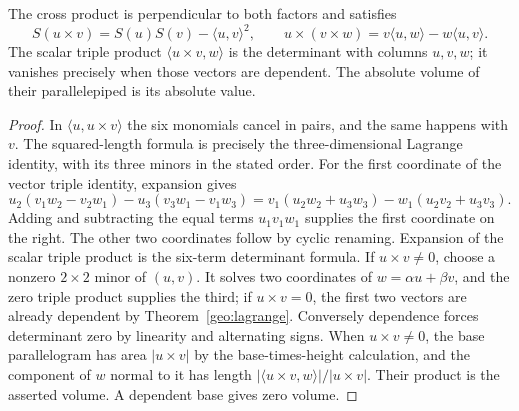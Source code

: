 \begin{theorem}
\label{geo:cross}
The cross product is perpendicular to both factors and satisfies
\[
 S(u\times v)=S(u)S(v)-\langle u,v\rangle^2,\qquad
 u\times(v\times w)=v\langle u,w\rangle-w\langle u,v\rangle.
\]
The scalar triple product $\langle u\times v,w\rangle$ is the determinant
with columns $u,v,w$; it vanishes precisely when those vectors are dependent.
The absolute volume of their parallelepiped is its absolute value.
\end{theorem}
\begin{proof}
In $\langle u,u\times v\rangle$ the six monomials cancel in pairs, and
the same happens with $v$. The squared-length formula is precisely the
three-dimensional Lagrange identity, with its three minors in the stated
order. For the first coordinate of the vector triple identity, expansion gives
\[
 u_2(v_1w_2-v_2w_1)-u_3(v_3w_1-v_1w_3)
 =v_1(u_2w_2+u_3w_3)-w_1(u_2v_2+u_3v_3).
\]
Adding and subtracting the equal terms $u_1v_1w_1$ supplies the first
coordinate on the right. The other two coordinates follow by cyclic renaming.
Expansion of the scalar triple product is the six-term determinant formula.
If $u\times v\ne0$, choose a nonzero $2\times2$ minor of $(u,v)$.
It solves two coordinates of $w=\alpha u+\beta v$, and the zero triple
product supplies the third; if $u\times v=0$, the first two vectors are
already dependent by Theorem~\ref{geo:lagrange}. Conversely dependence
forces determinant zero by linearity and alternating signs.
When $u\times v\ne0$, the base parallelogram has area $|u\times v|$ by
the base-times-height calculation, and the component of $w$ normal to it
has length $|\langle u\times v,w\rangle|/|u\times v|$.
Their product is the asserted volume. A dependent base gives zero volume.
\end{proof}

